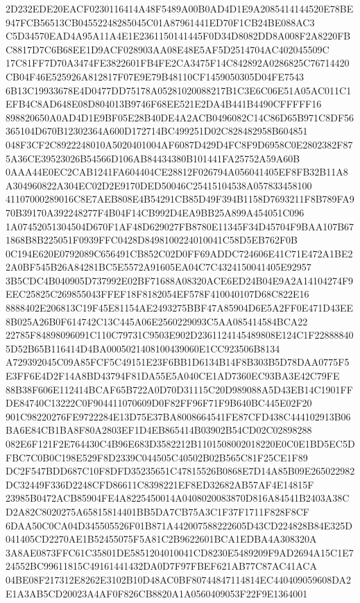 \documentclass[UTF8,fontset=fandol,zihao=-4,a4paper]{ctexart}
\begin{document}
{{2D232EDE20EACF0230116414A48F5489A00B0AD4D1E9A2085414144520E78BE947FCB56513CB04552248285045C01A87961441ED70F1CB24BE088AC3
C5D34570EAD4A95A11A4E1E2361150141445F0D34D8082DD8A008F2A8220FBC8817D7C6B68EE1D9ACF028903AA08E48E5AF5D2514704AC402045509C
17C81FF7D70A3474FE3822601FB4FE2CA3475F14C842892A0286825C76714420CB04F46E525926A812817F07E9E79B48110CF1459050305D04FE7543
6B13C19933678E4D0477DD75178A05281020088217B1C3E6C06E51A05AC011C1EFB4C8AD648E08D804013B9746F68EE521E2DA4B441B4490CFFFFF16
898820650A0AD4D1E9BF05E28B40DE4A2ACB0496082C14C86D65B971C8DF56365104D670B12302364A600D172714BC499251D02C828482958B604851
048F3CF2C8922248010A5020401004AF6087D429D4FC8F9D6958C0E2802382F875A36CE39523026B54566D106AB84434380B101441FA25752A59A60B
0AAA44E0EC2CAB1241FA604404CE28812F026794A056041405EF8FB32B11A8A304960822A304EC02D2E9170DED50046C25415104538A057833458100
41107000289016C8E7AEB808E4B54291CB85D49F394B1158D7693211F8B789FA970B39170A392248277F4B04F14CB992D4EA9BB25A899A454051C096
1A07452051304504D670F1AF48D629027FB8780E11345F34D45704F9BAA107B671868B8B225051F0939FFC0428D8498100224010041C58D5EB762F0B
0C194E620E0792089C656491CB852C02D0FF69ADDC724606E41C71E472A1BE22A0BF545B26A84281BC5E5572A91605EA04C7C4324150041405E92957
3B5CDC4B040905D737992E02BF71688A08320ACE6ED24B04E9A2A14104274F9EEC25825C269855043FFEF18F8182054EF578F410040107D68C822E16
8888402E206813C19F45E81154AE2493275BBF47A85904D6E5A2FF0E471D43EE8B025A26B0F614742C13C445A06E2560229093C5AA085414584BCA22
22785F84898096091C110C79731C9503E902D2361124145489808E124C1F228888405D52B65B116414D4BA0005021408100439060E1CC923506B8134
A729392045C09A85FCF5C49151E23F6BB1D6134B14F8B303B5D78DAA0775F5E3FF6E4D2F14A8BD43794F81DA55E5A040CE1AD7360EC93BA3E42C79FE
88B38F606E112414BCAF65B722A0D70D31115C20D989088A5D43EB14C1901FFDE84740C13222C0F904411070609D0F82FF96F71F9B640BC445E02F20
901C98220276FE9722284E13D75E37BA8008664541FE87CFD438C444102913B06BA6E84CB1BA8F80A2803EF1D4EB865414B03902B54CD02C02898288
082E6F121F2E764430C4B96E683D3582212B1101508002018220E0C0E1BD5EC5DFBC7C0B0C198E529F8D2339C044505C40502B02B565C81F25CE1F89
DC2F547BDD687C10F8DFD35235651C47815526B0868E7D14A85B09E265022982DC32449F336D2248CFD86611C8398221EF8ED32682AB57AF4E14815F
23985B0472ACB85904FE4A8225450014A0408020083870D816A84541B2403A38CD2A82C8020275A65815814401BB5DA7CB75A3C1F37F1711F828F8CF
6DAA50C0CA04D345505526F01B871A442007588222605D43CD224828B84E325D041405CD2270AE1B52455075F5A81C2B9622601BCA1EDBA4A308320A
3A8AE0873FFC61C35801DE5851204010041CD8230E5489209F9AD2694A15C1E724552BC99611815C49161441432DA0D7F97FBEF621AB77C87AC41ACA
04BE08F217312E8262E3102B10D48AC0BF80744847114814EC440409059608DA2E1A3AB5CD20023A4AF0F826CB8820A1A0560409053F22F9E1364001
}}
\end{document}

